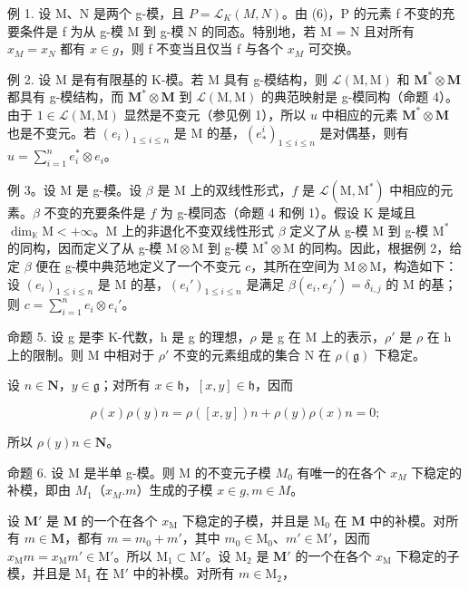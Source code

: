 例 1. 设 M、N 是两个 g-模，且 \(P = \mathcal{L}_{K}(M, N)\)。由 (6)，P 的元素 f 不变的充要条件是 f 为从 g-模 M 到 g-模 N 的同态。特别地，若 M = N 且对所有 \(x_{M} = x_{N}\) 都有 \(x \in g\)，则 f 不变当且仅当 f 与各个 \(x_{M}\) 可交换。

例 2. 设 M 是有有限基的 K-模。若 M 具有 g-模结构，则 \(\mathcal{L}(\mathrm{M},\mathrm{M})\) 和 \(\mathbf{M}^*\otimes \mathbf{M}\) 都具有 g-模结构，而 \(\mathbf{M}^{*}\otimes \mathbf{M}\) 到 \(\mathcal{L}(\mathrm{M},\mathrm{M})\) 的典范映射是 g-模同构（命题 4）。由于 \(1\in \mathcal{L}(\mathrm{M},\mathrm{M})\) 显然是不变元（参见例 1），所以 \(u\) 中相应的元素 \(\mathbf{M}^{*}\otimes \mathbf{M}\) 也是不变元。若 \((e_i)_{1\leq i\leq n}\) 是 M 的基，\((e_{*}^{i})_{1\leqslant i\leqslant n}\) 是对偶基，则有 \(u = \sum_{i = 1}^{n}e_{i}^{*}\otimes e_{i}\)。

例 3。设 M 是 g-模。设 \(\beta\) 是 M 上的双线性形式，\(f\) 是 \(\mathcal{L}(\mathrm{M},\mathrm{M}^*)\) 中相应的元素。\(\beta\) 不变的充要条件是 \(f\) 为 g-模同态（命题 4 和例 1）。假设 K 是域且 \(\dim_{\mathbb{K}}\mathrm{M} < +\infty\)。M 上的非退化不变双线性形式 \(\beta\) 定义了从 g-模 M 到 g-模 \(\mathrm{M}^*\) 的同构，因而定义了从 g-模 \(\mathrm{M}\otimes \mathrm{M}\) 到 g-模 \(\mathrm{M}^*\otimes \mathrm{M}\) 的同构。因此，根据例 2，给定 \(\beta\) 便在 g-模中典范地定义了一个不变元 \(c\)，其所在空间为 \(\mathrm{M}\otimes \mathrm{M}\)，构造如下：设 \((e_i)_{1\leqslant i\leqslant n}\) 是 M 的基，\((e_i')_{1\leqslant i\leqslant n}\) 是满足 \(\beta (e_i,e_j') = \delta_{i,j}\) 的 M 的基；则 \(c = \sum_{i=1}^{n}e_i\otimes e_i'\)。

命题 5. 设 g 是李 K-代数，h 是 g 的理想，\(\rho\) 是 g 在 M 上的表示，\(\rho'\) 是 \(\rho\) 在 h 上的限制。则 M 中相对于 \(\rho'\) 不变的元素组成的集合 N 在 \(\rho(\mathfrak{g})\) 下稳定。

设 \(n\in \mathbf{N}\)，\(y\in \mathfrak{g}\)；对所有 \(x\in \mathfrak{h}\)，\([x,y]\in \mathfrak{h}\)，因而

\[
\rho (x) \rho (y) n = \rho ([ x, y ]) n + \rho (y) \rho (x) n = 0;
\]

所以 \(\rho(y)n\in\mathbf{N}\)。

命题 6. 设 M 是半单 g-模。则 M 的不变元子模 \(M_{0}\) 有唯一的在各个 \(x_{M}\) 下稳定的补模，即由 \(M_{1}\)（\(x_{M}.m\)）生成的子模 \(x \in g, m \in M\)。

设 \(\mathbf{M}'\) 是 \(\mathbf{M}\) 的一个在各个 \(x_{\mathrm{M}}\) 下稳定的子模，并且是 \(\mathrm{M}_0\) 在 \(\mathbf{M}\) 中的补模。对所有 \(m \in \mathbf{M}\)，都有 \(m = m_0 + m'\)，其中 \(m_0 \in \mathrm{M}_0\)、\(m' \in \mathrm{M}'\)，因而 \(x_{\mathrm{M}}m = x_{\mathrm{M}}m' \in \mathrm{M}'\)。所以 \(\mathrm{M}_1 \subset \mathrm{M}'\)。设 \(\mathrm{M}_2\) 是 \(\mathbf{M}'\) 的一个在各个 \(x_{\mathrm{M}}\) 下稳定的子模，并且是 \(\mathrm{M}_1\) 在 \(\mathrm{M}'\) 中的补模。对所有 \(m \in \mathrm{M}_2\)，

